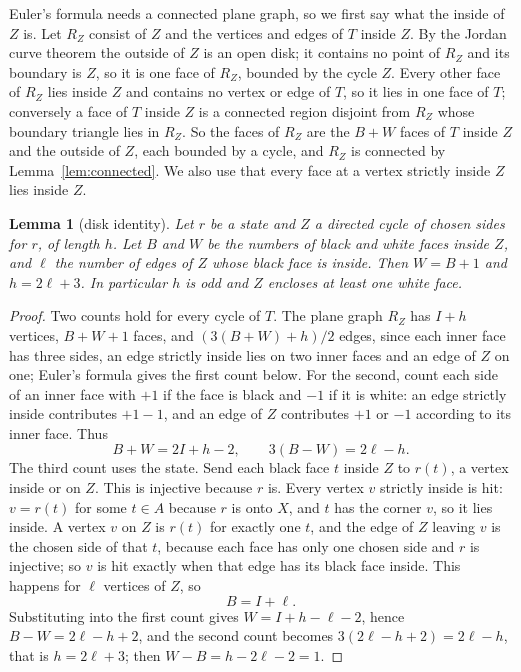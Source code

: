 \documentclass[10pt]{amsart}
\numberwithin{equation}{section}
\newtheorem{lemma}[equation]{Lemma}
\theoremstyle{definition}
\theoremstyle{remark}
\newcommand{\T}{T}
\begin{document}
Euler's formula needs a connected plane graph, so we first say what the inside of $Z$ is.
Let $R_Z$ consist of $Z$ and the vertices and edges of $\T$ inside $Z$.
By the Jordan curve theorem the outside of $Z$ is an open disk; it contains no point of $R_Z$ and its boundary is $Z$, so it is one face of $R_Z$, bounded by the cycle $Z$.
Every other face of $R_Z$ lies inside $Z$ and contains no vertex or edge of $\T$, so it lies in one face of $\T$; conversely a face of $\T$ inside $Z$ is a connected region disjoint from $R_Z$ whose boundary triangle lies in $R_Z$.
So the faces of $R_Z$ are the $B+W$ faces of $\T$ inside $Z$ and the outside of $Z$, each bounded by a cycle, and $R_Z$ is connected by Lemma~\ref{lem:connected}.
We also use that every face at a vertex strictly inside $Z$ lies inside $Z$.

\begin{lemma}[disk identity]\label{lem:disk}
Let $r$ be a state and $Z$ a directed cycle of chosen sides for $r$, of length $h$.
Let $B$ and $W$ be the numbers of black and white faces inside $Z$, and $\ell$ the number of edges of $Z$ whose black face is inside.
Then $W=B+1$ and $h=2\ell+3$.
In particular $h$ is odd and $Z$ encloses at least one white face.
\end{lemma}

\begin{proof}
Two counts hold for every cycle of $\T$.
The plane graph $R_Z$ has $I+h$ vertices, $B+W+1$ faces, and $(3(B+W)+h)/2$ edges, since each inner face has three sides, an edge strictly inside lies on two inner faces and an edge of $Z$ on one; Euler's formula gives the first count below.
For the second, count each side of an inner face with $+1$ if the face is black and $-1$ if it is white: an edge strictly inside contributes $+1-1$, and an edge of $Z$ contributes $+1$ or $-1$ according to its inner face.
Thus
\[
B+W=2I+h-2,\qquad 3(B-W)=2\ell-h .
\]
The third count uses the state.
Send each black face $t$ inside $Z$ to $r(t)$, a vertex inside or on $Z$.
This is injective because $r$ is.
Every vertex $v$ strictly inside is hit: $v=r(t)$ for some $t\in A$ because $r$ is onto $X$, and $t$ has the corner $v$, so it lies inside.
A vertex $v$ on $Z$ is $r(t)$ for exactly one $t$, and the edge of $Z$ leaving $v$ is the chosen side of that $t$, because each face has only one chosen side and $r$ is injective; so $v$ is hit exactly when that edge has its black face inside.
This happens for $\ell$ vertices of $Z$, so
\[
B=I+\ell .
\]
Substituting into the first count gives $W=I+h-\ell-2$, hence $B-W=2\ell-h+2$, and the second count becomes $3(2\ell-h+2)=2\ell-h$, that is $h=2\ell+3$; then $W-B=h-2\ell-2=1$.
\end{proof}
\end{document}
